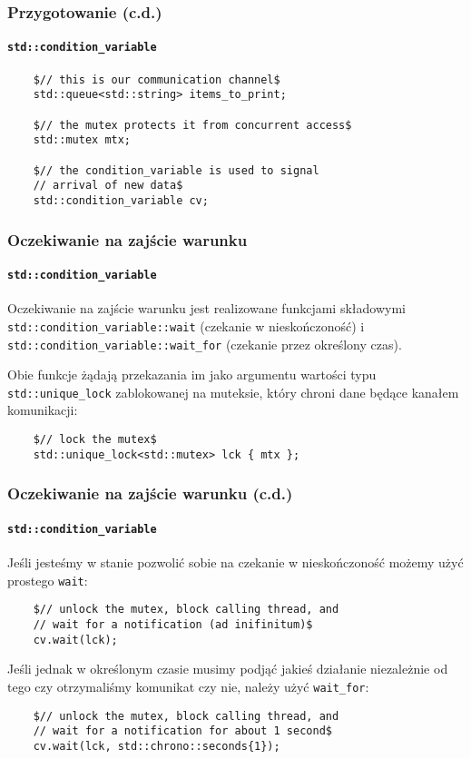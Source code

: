 \documentclass[aspectratio=169]{beamer}
\begin{document}
\begin{frame}[fragile]
    \frametitle{Przygotowanie (c.d.)}
    \framesubtitle{\texttt{std::condition\_variable}}

    {\small
    \begin{lstlisting}
    $// this is our communication channel$
    std::queue<std::string> items_to_print;

    $// the mutex protects it from concurrent access$
    std::mutex mtx;

    $// the condition_variable is used to signal
    // arrival of new data$
    std::condition_variable cv;
    \end{lstlisting}}
\end{frame}

\begin{frame}[fragile]
    \frametitle{Oczekiwanie na zajście warunku}
    \framesubtitle{\texttt{std::condition\_variable}}

    Oczekiwanie na zajście warunku jest realizowane funkcjami składowymi
    \texttt{std::condition\_variable::wait} (czekanie w nieskończoność) i
    \texttt{std::condition\_variable::wait\_for} (czekanie przez określony
    czas).

    \vspace{1em}

    Obie funkcje żądają przekazania im jako argumentu wartości typu
    \texttt{std::unique\_lock} zablokowanej na muteksie, który chroni dane
    będące kanałem komunikacji:

    {\scriptsize
    \begin{lstlisting}
    $// lock the mutex$
    std::unique_lock<std::mutex> lck { mtx };
    \end{lstlisting}}
\end{frame}

\begin{frame}[fragile]
    \frametitle{Oczekiwanie na zajście warunku (c.d.)}
    \framesubtitle{\texttt{std::condition\_variable}}

    Jeśli jesteśmy w stanie pozwolić sobie na czekanie w nieskończoność możemy
    użyć prostego \texttt{wait}:
    {\scriptsize
    \begin{lstlisting}
    $// unlock the mutex, block calling thread, and
    // wait for a notification (ad inifinitum)$
    cv.wait(lck);
    \end{lstlisting}}

    Jeśli jednak w określonym czasie musimy podjąć jakieś działanie niezależnie
    od tego czy otrzymaliśmy komunikat czy nie, należy użyć \texttt{wait\_for}:
    {\scriptsize
    \begin{lstlisting}
    $// unlock the mutex, block calling thread, and
    // wait for a notification for about 1 second$
    cv.wait(lck, std::chrono::seconds{1});
    \end{lstlisting}}
\end{frame}
\end{document}

